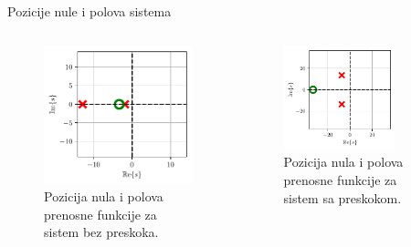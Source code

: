 \documentclass[aspectratio=169,xcolor=dvipsnames]{beamer}
\begin{document}
\begin{frame}{Pozicije nule i polova sistema}
	\begin{columns}[c]
    \begin{column}{.5\textwidth}
    \begin{figure}
        \centering
        \includegraphics[scale = 0.75]{fig/zplane/BezPreskok.pdf}
        \caption{Pozicija nula i polova prenosne funkcije za sistem bez preskoka.}
    \end{figure}      
    \end{column}
    \begin{column}{.5\textwidth}
    \begin{figure}
        \centering
        \includegraphics[width=0.75\textwidth]{fig/zplane/preskok.pdf}
        \caption{Pozicija nula i polova prenosne funkcije za sistem sa preskokom.}
    \end{figure}
    \end{column}
\end{columns}
\end{frame}
\end{document}

